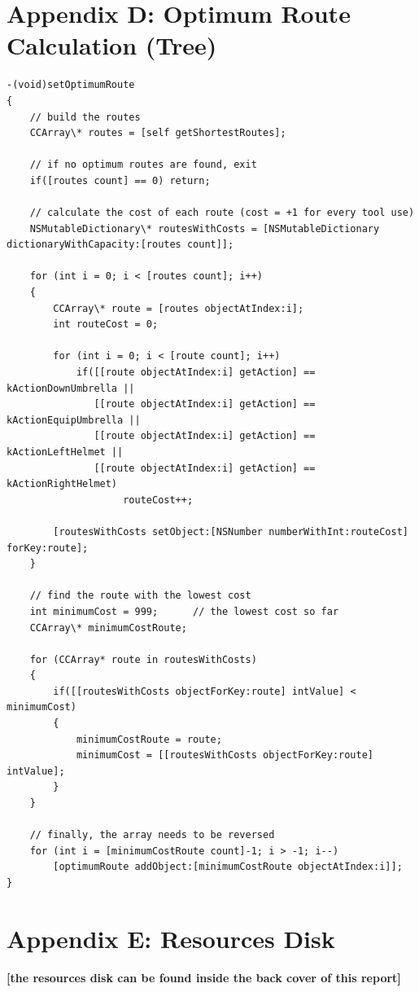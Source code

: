 \documentclass[a4paper,oneside]{report}
\begin{document}
\section{Appendix D: Optimum Route Calculation (Tree)}
\begin{lstlisting}
-(void)setOptimumRoute
{    
    // build the routes
    CCArray\* routes = [self getShortestRoutes];
    
    // if no optimum routes are found, exit
    if([routes count] == 0) return;
    
    // calculate the cost of each route (cost = +1 for every tool use)
    NSMutableDictionary\* routesWithCosts = [NSMutableDictionary dictionaryWithCapacity:[routes count]];
    
    for (int i = 0; i < [routes count]; i++) 
    {
        CCArray\* route = [routes objectAtIndex:i];
        int routeCost = 0;
        
        for (int i = 0; i < [route count]; i++) 
            if([[route objectAtIndex:i] getAction] == kActionDownUmbrella ||
               [[route objectAtIndex:i] getAction] == kActionEquipUmbrella ||
               [[route objectAtIndex:i] getAction] == kActionLeftHelmet ||
               [[route objectAtIndex:i] getAction] == kActionRightHelmet) 
                    routeCost++;
        
        [routesWithCosts setObject:[NSNumber numberWithInt:routeCost] forKey:route];
    }
    
    // find the route with the lowest cost
    int minimumCost = 999;      // the lowest cost so far
    CCArray\* minimumCostRoute;
    
    for (CCArray* route in routesWithCosts) 
    {
        if([[routesWithCosts objectForKey:route] intValue] < minimumCost)
        {
            minimumCostRoute = route;
            minimumCost = [[routesWithCosts objectForKey:route] intValue];
        }
    }
    
    // finally, the array needs to be reversed
    for (int i = [minimumCostRoute count]-1; i > -1; i--) 
        [optimumRoute addObject:[minimumCostRoute objectAtIndex:i]];
}
\end{lstlisting}
\newpage

\section{Appendix E: Resources Disk}

\textbf{[the resources disk can be found inside the back cover of this report]} \\
\end{document}
